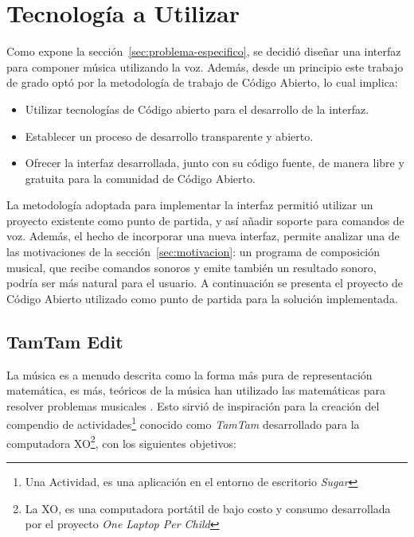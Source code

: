 \section{Tecnolog\'ia a Utilizar}
\label{sec:tecnologia-utilizada}

Como expone la secci\'on~\ref{sec:problema-especifico}, se decidi\'o dise\~nar
una interfaz para componer m\'usica utilizando la voz. Adem\'as, desde un principio
este trabajo de grado opt\'o por la metodolog\'ia de trabajo
de C\'odigo Abierto, lo cual implica: 

\begin{itemize}
    \item Utilizar tecnolog\'ias de C\'odigo abierto para el desarrollo de la interfaz.
    \item Establecer un proceso de desarrollo transparente y abierto.
    \item Ofrecer la interfaz desarrollada, junto con su código fuente, de manera libre 
        y gratuita para la comunidad de Código Abierto.
\end{itemize}

La metodolog\'ia adoptada para implementar la interfaz permiti\'o utilizar un proyecto
existente como punto de partida, y as\'i a\~nadir soporte para comandos de voz. Adem\'as,
el hecho de incorporar una nueva interfaz, permite analizar
una de las motivaciones de la secci\'on~\ref{sec:motivacion}: un programa de composici\'on
musical, que recibe comandos sonoros y emite tambi\'en un resultado sonoro, podr\'ia ser
m\'as natural para el usuario. A continuaci\'on se presenta el proyecto de C\'odigo Abierto
utilizado como punto de partida para la soluci\'on implementada.

\subsection{TamTam Edit}
\label{sec:tamtam-edit}

La m\'usica es a menudo descrita como la forma m\'as pura de representaci\'on matem\'atica, es m\'as, te\'oricos de la
m\'usica han utilizado las matem\'aticas para resolver problemas musicales \cite{TheSoundOfNumbers}. Esto sirvi\'o
de inspiraci\'on para la creaci\'on del compendio de actividades\footnote{Una Actividad, es una aplicaci\'on en el entorno 
de escritorio \emph{Sugar}}
conocido como \emph{TamTam} desarrollado para la computadora XO\footnote{La XO, es una computadora 
port\'atil de bajo costo y consumo desarrollada por el proyecto \emph{One Laptop Per Child}},
con los siguientes objetivos:

